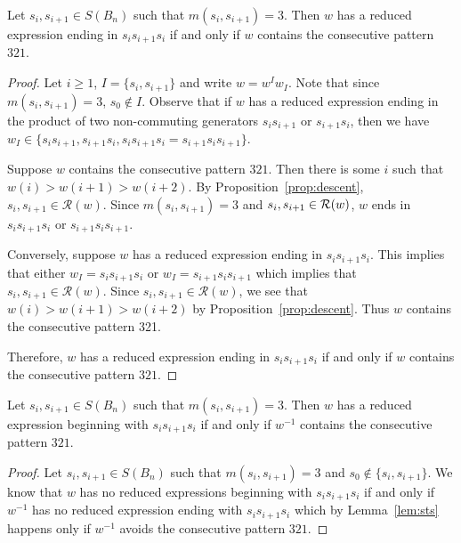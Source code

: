 \begin{lemma}\label{lem:sts}
Let $s_i,s_{i+1} \in S(B_n)$ such that $m(s_i,s_{i+1})=3$. Then $w$ has a reduced expression ending in $s_is_{i+1}s_i$ if and only if $w$ contains the consecutive pattern $321$.
\begin{proof}
	Let $i \geq 1$, $I=\{s_i,s_{i+1}\}$ and write $w=w^Iw_I$. Note that since $m(s_i,s_{i+1})=3$, $s_0 \notin I$. Observe that if $w$ has a reduced expression ending in the product of two non-commuting generators $s_is_{i+1}$ or $s_{i+1}s_i$, then we have $w_I \in \{s_is_{i+1}, s_{i+1}s_i, s_is_{i+1}s_i=s_{i+1}s_is_{i+1}\}$.
	
	Suppose $w$ contains the consecutive pattern $321$. Then there is some $i$ such that $w(i) > w(i+1) > w(i+2)$. By Proposition~\ref{prop:descent}, $s_i,s_{i+1} \in \mathcal{R}(w)$. Since $m(s_i,s_{i+1})=3$ and $s_i, s_{i+1} \in \mathcal{R}(w)$, $w$ ends in $s_is_{i+1}s_{i}$ or $s_{i+1}s_is_{i+1}$.
	
	Conversely, suppose $w$ has a reduced expression ending in $s_is_{i+1}s_i$. This implies that either $w_I=s_is_{i+1}s_i$ or $w_I=s_{i+1}s_is_{i+1}$ which implies that $s_i,s_{i+1} \in \mathcal{R}(w)$. Since $s_i,s_{i+1} \in \mathcal{R}(w)$, we see that $w(i)>w(i+1)>w(i+2)$ by Proposition~\ref{prop:descent}. Thus $w$ contains the consecutive pattern 321.
	
	Therefore, $w$ has a reduced expression ending in $s_is_{i+1}s_i$ if and only if $w$ contains the consecutive pattern $321$. 
\end{proof}	
\end{lemma}

\begin{corollary}\label{lem:endswithsts}
	Let $s_i,s_{i+1} \in S(B_n)$ such that $m(s_i,s_{i+1})=3$. Then $w$ has a reduced expression beginning with $s_is_{i+1}s_i$ if and only if $w^{-1}$ contains the consecutive pattern $321$.
	\begin{proof}
		Let $s_i,s_{i+1} \in S(B_n)$ such that $m(s_i,s_{i+1})=3$ and $s_0 \notin\{s_i,s_{i+1}\}$. We know that $w$ has no reduced expressions beginning with $s_is_{i+1}s_i$ if and only if $w^{-1}$ has no reduced expression ending with $s_is_{i+1}s_i$ which by Lemma~\ref{lem:sts} happens only if $w^{-1}$ avoids the consecutive pattern $321$.
	\end{proof}
\end{corollary}

